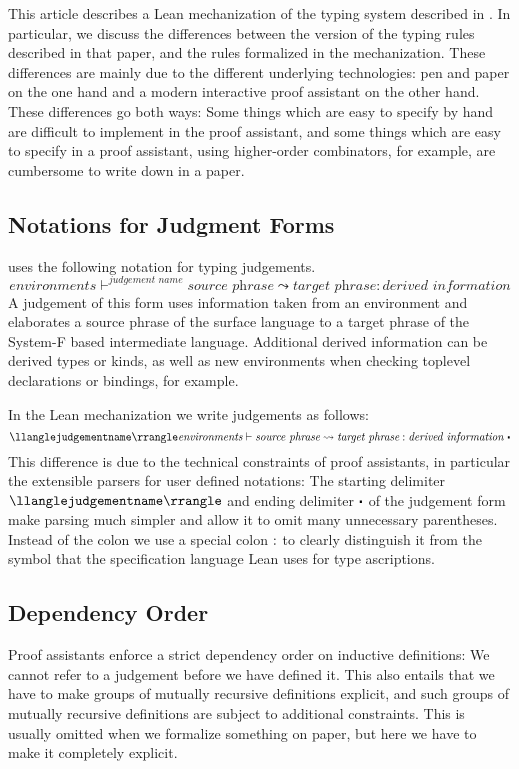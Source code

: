 This article describes a Lean mechanization of the typing system described in \cite{Faxen2002staticsemantics}.
In particular, we discuss the differences between the version of the typing rules described in that paper, and the rules formalized in the mechanization.
These differences are mainly due to the different underlying technologies: pen and paper on the one hand and a modern interactive proof assistant on the other hand.
These differences go both ways:
Some things which are easy to specify by hand are difficult to implement in the proof assistant, and some things which are easy to specify in a proof assistant, using higher-order combinators, for example, are cumbersome to write down in a paper.

\subsection{Notations for Judgment Forms}

\citet{Faxen2002staticsemantics} uses the following notation for typing judgements.
\begin{equation*}
    \textit{environments} \vdash^{\textit{judgement name}} \textit{source phrase} \leadsto \textit{target phrase} : \textit{derived information}
\end{equation*}
A judgement of this form uses information taken from an environment and elaborates a source phrase of the surface language to a target phrase of the System-F based intermediate language.
Additional derived information can be derived types or kinds, as well as new environments when checking toplevel declarations or bindings, for example.

In the Lean mechanization we write judgements as follows:
\begin{equation*}
    \jdgmtname{judgement name} \textit{environments} \vdash \textit{source phrase} \leadsto \textit{target phrase} \specialcolon \textit{derived information}\ \sqcdot
\end{equation*}
This difference is due to the technical constraints of proof assistants, in particular the extensible parsers for user defined notations:
The starting delimiter $\jdgmtname{judgement name}$ and ending delimiter $\sqcdot$ of the judgement form make parsing much simpler and allow it to omit many unnecessary parentheses.
Instead of the colon we use a special colon $:$ to clearly distinguish it from the symbol that the specification language Lean uses for type ascriptions.

\subsection{Dependency Order}
Proof assistants enforce a strict dependency order on inductive definitions: We cannot refer to a judgement before we have defined it.
This also entails that we have to make groups of mutually recursive definitions explicit, and such groups of mutually recursive definitions are subject to additional constraints.
This is usually omitted when we formalize something on paper, but here we have to make it completely explicit.

